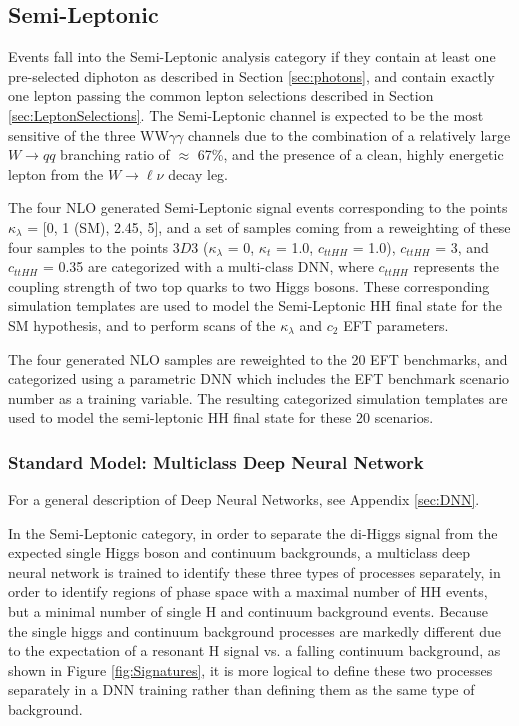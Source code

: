 \subsection{Semi-Leptonic} \label{sec:SL_Selections}

Events fall into the Semi-Leptonic analysis category if they contain at least one pre-selected diphoton as described in Section \ref{sec:photons}, and contain 
exactly one lepton passing the common lepton selections described in Section \ref{sec:LeptonSelections}. The Semi-Leptonic channel is expected to be the most 
sensitive of the three WW$\gamma\gamma$ channels due to the combination of a relatively large $W\rightarrow qq$ branching ratio of $\approx$ 67\%, and the presence of a clean, highly energetic 
lepton from the $W\rightarrow\ell\nu$ decay leg. 

The four NLO generated Semi-Leptonic signal events corresponding to the points $\kappa_{\lambda}$ = [0, 1 (SM), 2.45, 5], and a set of samples coming from a reweighting of these four samples to the points $3D3$ ($\kappa_{\lambda}$ = 0, $\kappa_{t}$ = 1.0, $c_{ttHH}$ = 1.0), $c_{ttHH}$ = 3, and $c_{ttHH}$ = 0.35 are categorized with a multi-class DNN, where $c_{ttHH}$ represents the coupling strength of two top quarks to two Higgs bosons. These corresponding simulation templates are used to model the Semi-Leptonic HH final state for the SM hypothesis, and to perform scans of the $\kappa_{\lambda}$ and $c_{2}$ EFT parameters. 

The four generated NLO samples are reweighted to the 20 EFT benchmarks, and categorized using a parametric DNN which includes the EFT benchmark scenario number as a training variable. The resulting categorized simulation templates are used to model the semi-leptonic HH final state for these 20 scenarios. 

\subsubsection{Standard Model: Multiclass Deep Neural Network}

For a general description of Deep Neural Networks, see Appendix \ref{sec:DNN}. 

In the Semi-Leptonic category, in order to separate the di-Higgs signal from the expected single Higgs boson and continuum backgrounds, a multiclass deep neural network is trained to identify these three types of processes 
separately, in order to identify regions of phase space with a maximal number of HH events, but a minimal number of single H and continuum background events. Because the single higgs and continuum background 
processes are markedly different due to the expectation of a resonant H signal vs. a falling continuum background, as shown in Figure \ref{fig:Signatures}, it is more logical to define these two processes separately in a DNN training rather 
than defining them as the same type of background. 

